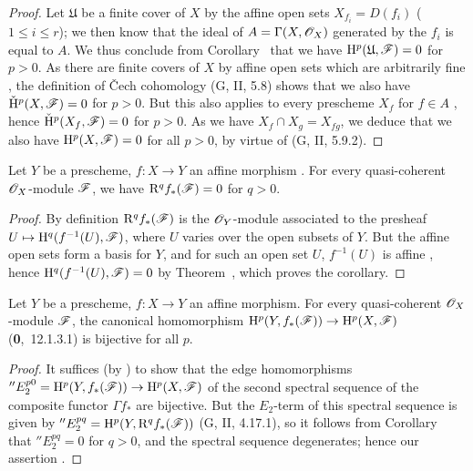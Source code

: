 \begin{proof}
\label{proof-III.1.3.1}
Let $\mathfrak{U}$ be a finite cover of $X$ by the affine open sets $X_{f_i}=D(f_i)$ ($1\leq i\leq r$); we then know that the ideal of $A=\Gamma(X,\mathscr{O}_X)$ generated by the $f_i$ is equal to $A$.
We thus conclude from Corollary~ that we have $\mathrm{H}^p(\mathfrak{U},\mathscr{F})=0$ for $p>0$.
As there are finite covers of $X$ by affine open sets which are arbitrarily fine , the definition of \v Cech cohomology (G, II, 5.8) shows that we also have $\check{\mathrm{H}}^p(X,\mathscr{F})=0$ for $p>0$.
But this also applies to every prescheme $X_f$ for $f\in A$ , hence $\check{\mathrm{H}}^p(X_f,\mathscr{F})=0$ for $p>0$.
As we have $X_f\cap X_g=X_{fg}$, we deduce that we also have $\mathrm{H}^p(X,\mathscr{F})=0$ for all $p>0$, by virtue of (G, II, 5.9.2).
\end{proof}

\begin{corollary}[1.3.2]
\label{III.1.3.2}
Let $Y$ be a prescheme, $f:X\to Y$ an affine morphism .
For every quasi-coherent $\mathscr{O}_X$-module $\mathscr{F}$, we have $\mathrm{R}^q f_*(\mathscr{F})=0$ for $q>0$.
\end{corollary}

\begin{proof}
\label{proof-III.1.3.2}
By definition $\mathrm{R}^q f_*(\mathscr{F})$ is the $\mathscr{O}_Y$-module associated to the presheaf $U\mapsto\HH^q(f^{-1}(U),\sh{F})$, where $U$ varies over the open subsets of $Y$.
But the affine open sets form a basis for $Y$, and for such an open set $U$, $f^{-1}(U)$ is affine , hence $\mathrm{H}^q(f^{-1}(U),\mathscr{F})=0$ by Theorem~, which proves the corollary.
\end{proof}

\begin{corollary}[1.3.3]
\label{III.1.3.3}
Let $Y$ be a prescheme, $f:X\to Y$ an affine morphism.
For every quasi-coherent $\mathscr{O}_X$-module $\mathscr{F}$, the canonical homomorphism $\HH^p(Y,f_*(\sh{F}))\to\HH^p(X,\sh{F})$ (\textbf{0},~12.1.3.1) is bijective for all $p$.
\end{corollary}

\begin{proof}
\label{proof-III.1.3.3}
It suffices (by ) to show that the edge homomorphisms $''E_2^{p0}=\HH^p(Y,f_*(\sh{F}))\to\HH^p(X,\sh{F})$ of the second spectral sequence of the composite functor $\Gamma f_*$ are bijective.
But the $E_2$-term of this spectral sequence is given by $''E_2^{pq}=\mathrm{H}^p(Y,\mathrm{R}^q f_*(\mathscr{F}))$ (G, II, 4.17.1), so it follows from Corollary~ that $''E_2^{pq}=0$ for $q>0$, and the spectral sequence degenerates; hence our assertion .
\end{proof}

